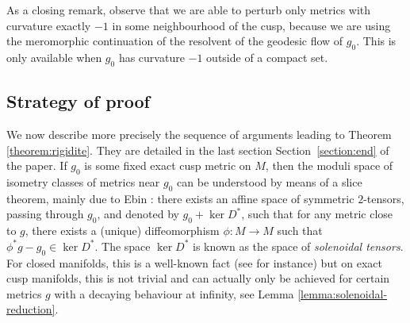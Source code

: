 \documentclass[JEP,XML,SOM,Unicode,NoFloatCountersInSection]{cedram}
\theoremstyle{plain}
\theoremstyle{definition}
\begin{document}
As a closing remark, observe that we are able to perturb only metrics with curvature exactly $-1$ in some neighbourhood of the cusp, because we are using the meromorphic continuation of the resolvent of the geodesic flow of $g_0$. This is only available when $g_0$ has curvature $-1$ outside of a compact set.\enlargethispage{.5\baselineskip}

\subsection{Strategy of proof}
We now describe more precisely the sequence of arguments leading to Theorem \ref{theorem:rigidite}. They are detailed in the last section Section~\ref{section:end} of the paper. If $g_0$ is some fixed exact cusp metric on $M$, then the moduli space of isometry classes of metrics near $g_0$ can be understood by means of a slice theorem, mainly due to Ebin \cite{Ebin-68}: there exists an affine space of symmetric $2$-tensors, passing through $g_0$, and denoted by $g_0 + \ker D^*$, such that for any metric close to $g$, there exists a (unique) diffeomorphism $\phi : M \to M$ such that $\phi^*g-g_0 \in \ker D^*$. The space $\ker D^*$ is known as the space of \emph{solenoidal tensors}. For closed manifolds, this is a well-known fact (see \cite[Lem.\,4.1]{Guillarmou-Lefeuvre-18} for instance) but on exact cusp manifolds, this is not trivial and can actually only be achieved for certain metrics $g$ with a decaying behaviour at infinity, see Lemma \ref{lemma:solenoidal-reduction}.
\end{document}
